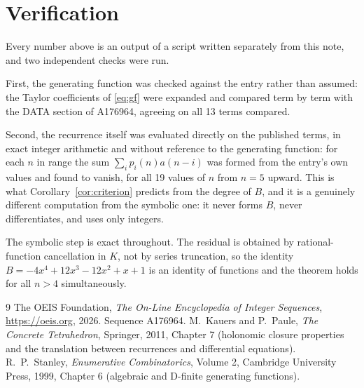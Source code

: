 \documentclass[11pt,a4paper]{article}
\theoremstyle{plain}
\theoremstyle{definition}
\begin{document}
\section{Verification}

Every number above is an output of a script written separately from this note, and two
independent checks were run.

First, the generating function was checked against the entry rather than assumed: the
Taylor coefficients of \eqref{eq:gf} were expanded and compared term by term with the DATA
section of A176964, agreeing on all 13 terms compared.

Second, the recurrence itself was evaluated directly on the published terms, in exact
integer arithmetic and without reference to the generating function: for each $n$ in range
the sum $\sum_{i}p_{i}(n)a(n-i)$ was formed from the entry's own values and found to
vanish, for all 19 values of $n$ from $n=5$ upward. This is what
Corollary~\ref{cor:criterion} predicts from the degree of $B$, and it is a genuinely
different computation from the symbolic one: it never forms $B$, never differentiates, and
uses only integers.

The symbolic step is exact throughout. The residual is obtained by rational-function
cancellation in $K$, not by series truncation, so the identity $B=- 4 x^{4} + 12 x^{3} - 12 x^{2} + x + 1$ is an
identity of functions and the theorem holds for all $n>4$ simultaneously.

\begin{thebibliography}{9}
 The OEIS Foundation, \emph{The On-Line Encyclopedia of Integer Sequences},
\url{https://oeis.org}, 2026. Sequence A176964.
 M.~Kauers and P.~Paule, \emph{The Concrete Tetrahedron}, Springer, 2011,
Chapter 7 (holonomic closure properties and the translation between recurrences and
differential equations).
 R.~P.~Stanley, \emph{Enumerative Combinatorics}, Volume 2, Cambridge
University Press, 1999, Chapter 6 (algebraic and D-finite generating functions).
\end{thebibliography}
\end{document}
